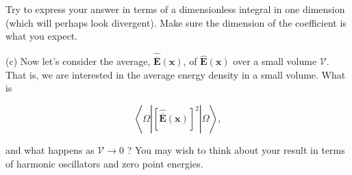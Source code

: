 \documentclass[10pt]{article}
\begin{document}
Try to express your answer in terms of a dimensionless integral in one dimension (which will perhaps look divergent). Make sure the dimension of the coefficient is what you expect.

(c) Now let's consider the average, $\hat{\overline{\mathbf{E}}}(\mathbf{x})$, of $\hat{\mathbf{E}}(\mathbf{x})$ over a small volume $\mathcal{V}$. That is, we are interested in the average energy density in a small volume. What is


\begin{equation*}
\left\langle\Omega\left|[\hat{\overline{\mathbf{E}}}(\mathbf{x})]^{2}\right| \Omega\right\rangle, \tag{9}
\end{equation*}


and what happens as $\mathcal{V} \rightarrow 0$ ? You may wish to think about your result in terms of harmonic oscillators and zero point energies.
\end{document}
